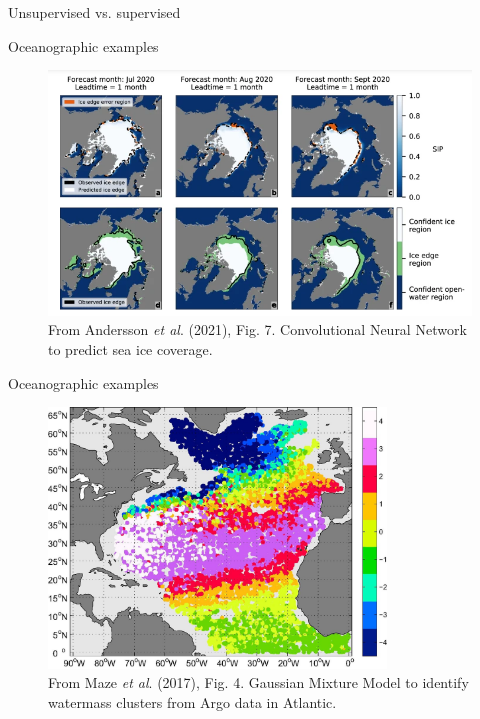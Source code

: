 \documentclass[xcolor=x11names,compress]{beamer}
\renewcommand{\(}{\begin{columns}}
\renewcommand{\)}{\end{columns}}
\newcommand{\<}[1]{\begin{column}{#1}}
\renewcommand{\>}{\end{column}}
\begin{document}
\begin{frame}{Unsupervised vs. supervised}
\end{frame}


\begin{frame}{Oceanographic examples}

\begin{figure}
  \includegraphics[width=\textwidth]{Andersson_et_al_2021_fig7}
  \caption{From Andersson \emph{et al}. (2021), Fig. 7. Convolutional Neural
  Network to predict sea ice coverage.}
\end{figure}

\end{frame}


\begin{frame}{Oceanographic examples}

\begin{figure}
  \includegraphics[width=0.8\textwidth]{Maze_et_al_2017_fig4}
  \caption{From Maze \emph{et al}. (2017), Fig. 4. Gaussian Mixture Model to
  identify watermass clusters from Argo data in Atlantic.}
\end{figure}

\end{frame}
\end{document}
